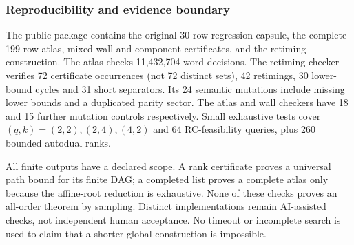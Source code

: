 \subsubsection{Reproducibility and evidence boundary}
The public package contains the original 30-row regression capsule,
the complete 199-row atlas, mixed-wall and component certificates,
and the retiming construction. The atlas checks 11,432,704 word
decisions. The retiming checker verifies 72 certificate occurrences
(not 72 distinct sets), 42 retimings, 30 lower-bound cycles and
31 short separators. Its 24 semantic mutations include missing
lower bounds and a duplicated parity sector. The atlas and wall
checkers have 18 and 15 further mutation controls respectively.
Small exhaustive tests cover $(q,k)=(2,2),(2,4),(4,2)$ and 64
RC-feasibility queries, plus 260 bounded autodual ranks.

All finite outputs have a declared scope. A rank certificate proves
a universal path bound for its finite DAG; a completed list proves
a complete atlas only because the affine-root reduction is
exhaustive. None of these checks proves an all-order theorem by
sampling. Distinct implementations remain AI-assisted checks,
not independent human acceptance. No timeout or incomplete
search is used to claim that a shorter global construction is
impossible.

